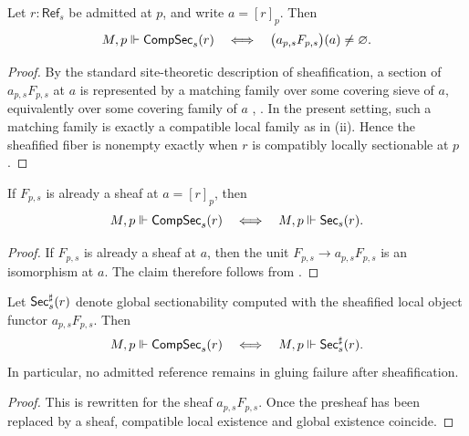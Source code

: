 \begin{theorem}\label{thm:sheafification-characterization}
Let $r:\mathsf{Ref}_s$ be admitted at $p$, and write $a=[r]_p$. Then
\[
M,p\Vdash \mathsf{CompSec}_s(r)
\quad\Longleftrightarrow\quad
\bigl(a_{p,s}F_{p,s}\bigr)(a)\neq\varnothing.
\]
\end{theorem}

\begin{proof}
By the standard site-theoretic description of sheafification, a section of $a_{p,s}F_{p,s}$ at $a$ is represented by a matching family over some covering sieve of $a$, equivalently over some covering family of $a$ \cite[Chap.~III, \S2]{MacLaneMoerdijk1994}, \cite[Part~B2.2]{Johnstone2002}. In the present setting, such a matching family is exactly a compatible local family as in (ii). Hence the sheafified fiber is nonempty exactly when $r$ is compatibly locally sectionable at $p$.
\end{proof}

\begin{corollary}\label{cor:sheaf-local-to-global}
If $F_{p,s}$ is already a sheaf at $a=[r]_p$, then
\[
M,p\Vdash \mathsf{CompSec}_s(r)
\quad\Longleftrightarrow\quad
M,p\Vdash \mathsf{Sec}_s(r).
\]
\end{corollary}

\begin{proof}
If $F_{p,s}$ is already a sheaf at $a$, then the unit $F_{p,s}\to a_{p,s}F_{p,s}$ is an isomorphism at $a$. The claim therefore follows from .
\end{proof}

\begin{corollary}\label{cor:sheafification-removes-glue}
Let $\mathsf{Sec}_s^{\sharp}(r)$ denote global sectionability computed with the sheafified local object functor $a_{p,s}F_{p,s}$. Then
\[
M,p\Vdash \mathsf{CompSec}_s(r)
\quad\Longleftrightarrow\quad
M,p\Vdash \mathsf{Sec}_s^{\sharp}(r).
\]
In particular, no admitted reference remains in gluing failure after sheafification.
\end{corollary}

\begin{proof}
This is  rewritten for the sheaf $a_{p,s}F_{p,s}$. Once the presheaf has been replaced by a sheaf, compatible local existence and global existence coincide.
\end{proof}

